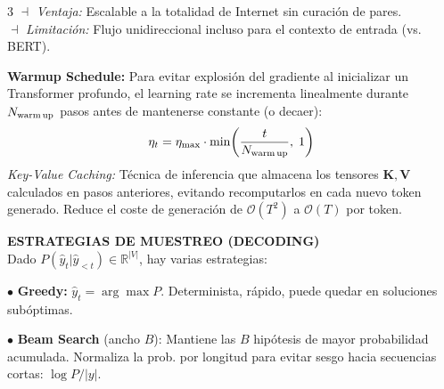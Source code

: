 \documentclass[8pt,a4paper,landscape,fleqn]{extarticle}
\begin{document}
\begin{multicols*}{3}
$\dashv$ \textit{Ventaja:} Escalable a la totalidad de Internet sin curación de pares.\\
$\dashv$ \textit{Limitación:} Flujo unidireccional incluso para el contexto de entrada (vs. BERT).
 
\textbf{Warmup Schedule:} Para evitar explosión del gradiente al inicializar un Transformer profundo, el learning rate se incrementa linealmente durante $N_{\rm warm\,up}$ pasos antes de mantenerse constante (o decaer):
$$\eta_t = \eta_{\max} \cdot \min\!\left(\frac{t}{N_{\rm warm\, up}},\; 1\right)$$
\textit{Key-Value Caching:} Técnica de inferencia que almacena los tensores $\bm{K}, \bm{V}$ calculados en pasos anteriores, evitando recomputarlos en cada nuevo token generado. Reduce el coste de generación de $\mathcal{O}(T^2)$ a $\mathcal{O}(T)$ por token.
 
 
\textbf{ESTRATEGIAS DE MUESTREO (DECODING)}\\
Dado $P(\hat{y}_t | \hat{y}_{<t}) \in \mathbb{R}^{|V|}$, hay varias estrategias:
 
$\bullet$ \textbf{Greedy:} $\hat{y}_t = \arg\max P$. Determinista, rápido, puede quedar en soluciones subóptimas.
 
$\bullet$ \textbf{Beam Search} (ancho $B$): Mantiene las $B$ hipótesis de mayor probabilidad acumulada. Normaliza la prob. por longitud para evitar sesgo hacia secuencias cortas: $\log P / |y|$.
 

\end{multicols*}
\end{document}
